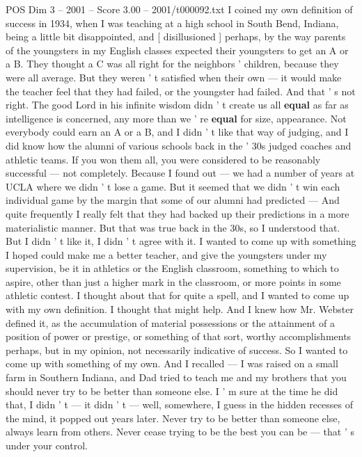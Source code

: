 \begin{textsample}{POS Dim 3 – 2001 – Score 3.00 – 2001/t000092.txt}  \label{ex:f3_pos_002}
I coined my own definition of success in 1934, when I was teaching at a high school in South Bend, Indiana, being a little bit disappointed, and [ disillusioned ] perhaps, by the way parents of the youngsters in my English classes expected their youngsters to get an A or a B.
They thought a C was all right for the neighbors ' children, because they were all average.
But they weren ' t satisfied when their own — it would make the teacher feel that they had failed, or the youngster had failed.
And that ' s not right.
The good Lord in his infinite wisdom didn ' t create us all \textbf{equal} as far as intelligence is concerned, any more than we ' re \textbf{equal} for size, appearance.
Not everybody could earn an A or a B, and I didn ' t like that way of judging, and I did know how the alumni of various schools back in the ' 30s judged coaches and athletic teams.
If you won them all, you were considered to be reasonably successful — not completely.
Because I found out — we had a number of years at UCLA where we didn ' t lose a game.
But it seemed that we didn ' t win each individual game by the margin that some of our alumni had predicted — And quite frequently I really felt that they had backed up their predictions in a more materialistic manner.
But that was true back in the 30s, so I understood that.
But I didn ' t like it, I didn ' t agree with it.
I wanted to come up with something I hoped could make me a better teacher, and give the youngsters under my supervision, be it in athletics or the English classroom, something to which to aspire, other than just a higher mark in the classroom, or more points in some athletic contest.
I thought about that for quite a spell, and I wanted to come up with my own definition.
I thought that might help.
And I knew how Mr.
Webster defined it, as the accumulation of material possessions or the attainment of a position of power or prestige, or something of that sort, worthy accomplishments perhaps, but in my opinion, not necessarily indicative of success.
So I wanted to come up with something of my own.
And I recalled — I was raised on a small farm in Southern Indiana, and Dad tried to teach me and my brothers that you should never try to be better than someone else.
I ' m sure at the time he did that, I didn ' t — it didn ' t — well, somewhere, I guess in the hidden recesses of the mind, it popped out years later.
Never try to be better than someone else, always learn from others.
Never cease trying to be the best you can be — that ' s under your control.

\end{textsample}
